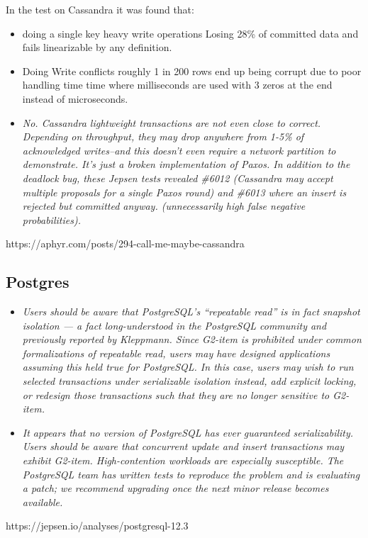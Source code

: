 \documentclass[a4paper,10pt,titlepage]{report}
\begin{document}
    In the test on Cassandra it was found that:
    \begin{itemize}
        \item doing a single key heavy write operations Losing 28\% of committed data and fails linearizable by any definition.
        \item Doing Write conflicts roughly 1 in 200 rows end up being corrupt due to poor handling time time where milliseconds are used with 3 zeros at the end instead of microseconds.
        \item \textit{No. Cassandra lightweight transactions are not even close to correct. Depending on throughput, they may drop anywhere from 1-5\% of acknowledged writes–and this doesn’t even require a network partition to demonstrate. It’s just a broken implementation of Paxos. In addition to the deadlock bug, these Jepsen tests revealed \#6012 (Cassandra may accept multiple proposals for a single Paxos round) and \#6013 where an insert is rejected but committed anyway. (unnecessarily high false negative probabilities).}
    \end{itemize}

    https://aphyr.com/posts/294-call-me-maybe-cassandra


    \subsection{Postgres}
    
    
    
    \begin{itemize}
        \item \textit{Users should be aware that PostgreSQL’s “repeatable read” is in fact snapshot isolation — a fact long-understood in the PostgreSQL community and previously reported by Kleppmann. Since G2-item is prohibited under common formalizations of repeatable read, users may have designed applications assuming this held true for PostgreSQL. In this case, users may wish to run selected transactions under serializable isolation instead, add explicit locking, or redesign those transactions such that they are no longer sensitive to G2-item.}
        \item \textit{It appears that no version of PostgreSQL has ever guaranteed serializability. Users should be aware that concurrent update and insert transactions may exhibit G2-item. High-contention workloads are especially susceptible. The PostgreSQL team has written tests to reproduce the problem and is evaluating a patch; we recommend upgrading once the next minor release becomes available.}
    \end{itemize}
    https://jepsen.io/analyses/postgresql-12.3
\end{document}
